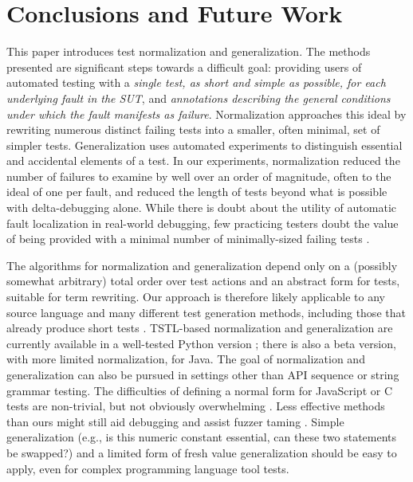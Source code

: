 \section{Conclusions and Future Work}

This paper introduces test normalization and generalization.  The
methods presented are significant steps towards a difficult goal:
providing users of automated testing with a \emph{single test, as
  short and simple as possible, for each underlying fault in the SUT},
and \emph{annotations describing the general conditions under which
  the fault manifests as failure}.  Normalization approaches this
ideal by rewriting numerous distinct failing tests into a smaller,
often minimal, set of simpler tests.  Generalization uses automated
experiments to distinguish essential and accidental elements of a
test.  In our experiments, normalization reduced the number of
failures to examine by well over an order of magnitude, often to the
ideal of one per fault, and reduced the length of tests beyond what is
possible with delta-debugging alone.  While there is doubt about the
utility of automatic fault localization \cite{AutoHelp} in real-world debugging, few practicing testers
doubt the value of being provided with a minimal number of
minimally-sized failing tests \cite{MinUnit,lithium,AMAI}.

The algorithms for normalization and
generalization depend only on a (possibly somewhat arbitrary) total order
over test actions and an abstract form for tests, suitable for term
rewriting.  Our approach is therefore likely applicable to any source language
and many different test generation methods, including those that
already produce short tests \cite{FA11,SoftBET}.  TSTL-based
normalization and generalization are currently available in a
well-tested Python version \cite{tstl,ISSTA15}; there is also a beta version, with more limited
normalization, for Java.
The goal of normalization and generalization can also be pursued in
settings other than API sequence or string grammar testing.  The
difficulties of defining a normal form for JavaScript \cite{jsfunfuzz}
or C \cite{csmith} tests are non-trivial, but not obviously
overwhelming \cite{CReduce}. Less effective methods
than ours might still aid debugging and assist fuzzer taming
\cite{PLDI13}.  Simple generalization (e.g., is this numeric constant
essential, can these two statements be swapped?) and a limited form of
fresh value generalization should be easy to apply, even for complex
programming language tool tests.  

